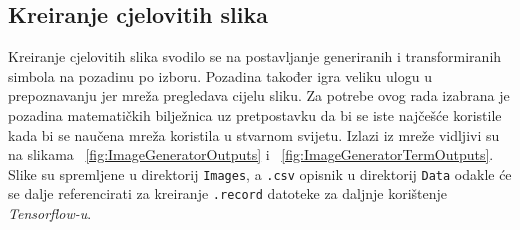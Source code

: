 \subsection{Kreiranje cjelovitih slika}
Kreiranje cjelovitih slika svodilo se na postavljanje generiranih i transformiranih simbola na pozadinu po izboru.
Pozadina također igra veliku ulogu u prepoznavanju jer mreža pregledava cijelu sliku.
Za potrebe ovog rada izabrana je pozadina matematičkih bilježnica uz pretpostavku da bi se iste najčešće koristile kada bi se naučena mreža koristila u stvarnom svijetu.
Izlazi iz mreže vidljivi su na slikama ~\ref{fig:ImageGeneratorOutputs} i ~\ref{fig:ImageGeneratorTermOutputs}.
Slike su spremljene u direktorij \texttt{Images}, a \texttt{.csv} opisnik u direktorij \texttt{Data} odakle će se dalje referencirati za kreiranje \texttt{.record} datoteke za daljnje korištenje \emph{Tensorflow-u}.
\begin{figure}

\end{figure}

